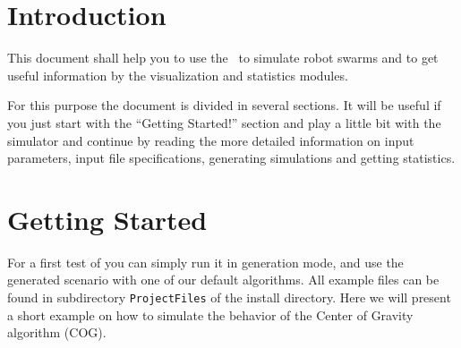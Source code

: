 \documentclass[a4paper,halfparskip,11pt,twoside]{scrartcl}
\begin{document}
\init{}


\section{Introduction}
This document shall help you to use the \RSS\ to simulate robot swarms and to get useful information by the visualization and statistics modules.

For this purpose the document is divided in several sections. It will be useful if you just start with the ``Getting Started!'' section and play a little bit with the simulator and continue by reading the more detailed information on input parameters, input file specifications, generating simulations and getting statistics.


\section{Getting Started}
For a first test of \RSS you can simply run it in generation mode, and use the generated scenario with one of our default algorithms. All example files can be found in subdirectory {\tt ProjectFiles} of the install directory. Here we will present a short example on how to simulate the behavior of the {\sffamily Center of Gravity} algorithm (COG).
\end{document}
